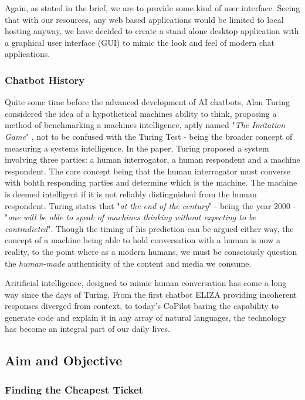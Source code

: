 \documentclass[11pt]{article}
\begin{document}
Again, as stated in the brief, we are to provide some kind of user interface. Seeing that with our resources, any web based applications would be limited to local hosting anyway, we have decided to create a stand alone desktop application with a graphical user interface (GUI) to mimic the look and feel of modern chat applications.

\subsubsection{Chatbot History}

Quite some time before the advanced development of AI chatbots, Alan Turing considered the idea of a hypothetical machines ability to think, proposing a method of benchmarking a machines intelligence, aptly named "\textit{The Imitation Game}" \cite{Turing1950}, not to be confused with the Turing Test - being the broader concept of measuring a systems intelligence. In the paper, Turing proposed a system involving three parties: a human interrogator, a human respondent and a machine respondent. The core concept being that the human interrogator must converse with bohth responding parties and determine which is the machine. The machine is deemed intelligent if it is not reliably distinguished from the human respondent. Turing states that "\textit{at the end of the century}" - being the year 2000 - "\textit{one will be able to speak of machines thinking without expecting to be contradicted}". Though the timing of his prediction can be argued either way, the concept of a machine being able to hold conversation with a human is now a reality, to the point where as a modern humans, we must be consciously question the \textit{human-made} authenticity of the content and media we consume.

Aritificial intelligence, designed to mimic human conversation has come a long way since the days of Turing. From the first chatbot ELIZA \cite{eliza} providing incoherent responses diverged from context, to today's CoPilot \cite{copilot} baring the capability to generate code and explain it in any array of natural languages, the technology has become an integral part of our daily lives.


\subsection{Aim and Objective} 

\subsubsection{Finding the Cheapest Ticket}
\end{document}
